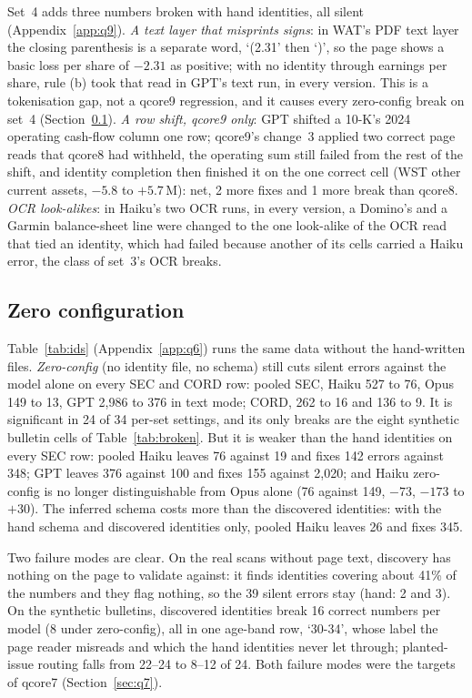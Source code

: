 \documentclass[10pt,twocolumn]{article}
\newcommand{\vq}[1]{\textsf{qcore#1}}
\begin{document}
Set~4 adds three numbers broken with hand identities, all silent (Appendix~\ref{app:q9}). \emph{A text layer that misprints signs}: in WAT's PDF text layer the closing parenthesis is a separate word, `(2.31' then `)', so the page shows a basic loss per share of $-2.31$ as positive; with no identity through earnings per share, rule (b) took that read in GPT's text run, in every version. This is a tokenisation gap, not a \vq{9} regression, and it causes every zero-config break on set~4 (Section~\ref{sec:zeroconfig}). \emph{A row shift, \vq{9} only}: GPT shifted a 10-K's 2024 operating cash-flow column one row; \vq{9}'s change~3 applied two correct page reads that \vq{8} had withheld, the operating sum still failed from the rest of the shift, and identity completion then finished it on the one correct cell (WST other current assets, $-5.8$ to $+5.7$\,M): net, 2 more fixes and 1 more break than \vq{8}. \emph{OCR look-alikes}: in Haiku's two OCR runs, in every version, a Domino's and a Garmin balance-sheet line were changed to the one look-alike of the OCR read that tied an identity, which had failed because another of its cells carried a Haiku error, the class of set~3's OCR breaks.

\subsection{Zero configuration}\label{sec:zeroconfig}
Table~\ref{tab:ids} (Appendix~\ref{app:q6}) runs the same data without the hand-written files. \emph{Zero-config} (no identity file, no schema) still cuts silent errors against the model alone on every SEC and CORD row: pooled SEC, Haiku 527 to 76, Opus 149 to 13, GPT 2,986 to 376 in text mode; CORD, 262 to 16 and 136 to 9. It is significant in 24 of 34 per-set settings, and its only breaks are the eight synthetic bulletin cells of Table~\ref{tab:broken}. But it is weaker than the hand identities on every SEC row: pooled Haiku leaves 76 against 19 and fixes 142 errors against 348; GPT leaves 376 against 100 and fixes 155 against 2,020; and Haiku zero-config is no longer distinguishable from Opus alone (76 against 149, $-73$, $-173$ to $+30$). The inferred schema costs more than the discovered identities: with the hand schema and discovered identities only, pooled Haiku leaves 26 and fixes 345.

Two failure modes are clear. On the real scans without page text, discovery has nothing on the page to validate against: it finds identities covering about 41\% of the numbers and they flag nothing, so the 39 silent errors stay (hand: 2 and 3). On the synthetic bulletins, discovered identities break 16 correct numbers per model (8 under zero-config), all in one age-band row, `30-34', whose label the page reader misreads and which the hand identities never let through; planted-issue routing falls from 22--24 to 8--12 of 24. Both failure modes were the targets of \vq{7} (Section~\ref{sec:q7}).
\end{document}
